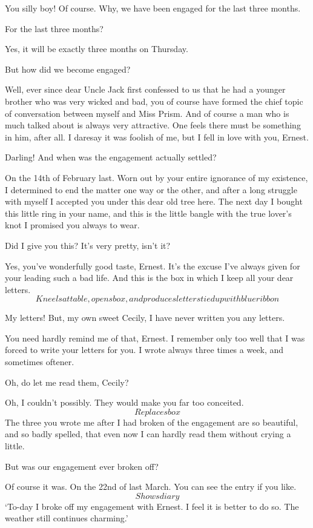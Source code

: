 \documentclass{book}
\begin{document}
\5  You silly boy!  Of course.  Why, we have been engaged for
the last three months.

\2  For the last three months?

\5  Yes, it will be exactly three months on Thursday.

\2  But how did we become engaged?

\5  Well, ever since dear Uncle Jack first confessed to us
that he had a younger brother who was very wicked and bad, you of
course have formed the chief topic of conversation between myself
and Miss Prism.  And of course a man who is much talked about is
always very attractive.  One feels there must be something in him,
after all.  I daresay it was foolish of me, but I fell in love with
you, Ernest.

\2  Darling!  And when was the engagement actually settled?

\5  On the 14th of February last.  Worn out by your entire
ignorance of my existence, I determined to end the matter one way
or the other, and after a long struggle with myself I accepted you
under this dear old tree here.  The next day I bought this little
ring in your name, and this is the little bangle with the true
lover's knot I promised you always to wear.

\2  Did I give you this?  It's very pretty, isn't it?

\5  Yes, you've wonderfully good taste, Ernest.  It's the
excuse I've always given for your leading such a bad life.  And
this is the box in which I keep all your dear letters.  \[Kneels at
table, opens box, and produces letters tied up with blue ribbon\]

\2  My letters!  But, my own sweet Cecily, I have never
written you any letters.

\5  You need hardly remind me of that, Ernest.  I remember
only too well that I was forced to write your letters for you.  I
wrote always three times a week, and sometimes oftener.

\2  Oh, do let me read them, Cecily?


\5  Oh, I couldn't possibly.  They would make you far too
conceited. \[Replaces box\]  The three you wrote me after I had
broken of the engagement are so beautiful, and so badly spelled,
that even now I can hardly read them without crying a little.

\2  But was our engagement ever broken off?

\5  Of course it was.  On the 22nd of last March.  You can see
the entry if you like. \[Shows diary\]  `To-day I broke off my
engagement with Ernest.  I feel it is better to do so.  The weather
still continues charming.'
\end{document}
